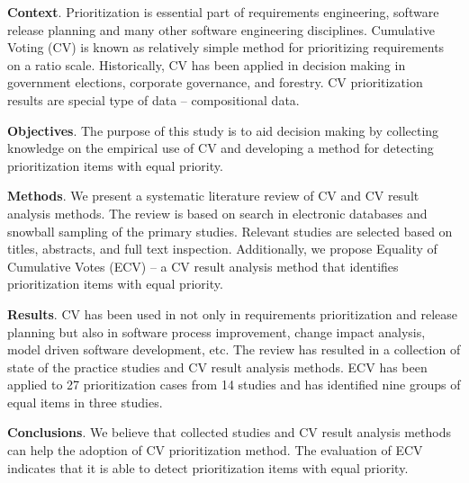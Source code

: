 
\textbf{Context}.
Prioritization is essential part of requirements engineering, software release planning and many other software engineering disciplines.
Cumulative Voting (CV) is known as relatively simple method for prioritizing requirements on a ratio scale.
Historically, CV has been applied in decision making in government elections, corporate governance, and forestry.
CV prioritization results are special type of data -- compositional data.

\textbf{Objectives}.
The purpose of this study is to aid decision making by collecting knowledge on the empirical use of CV and
developing a method for detecting prioritization items with equal priority.

\textbf{Methods}.
We present a systematic literature review of CV and CV result analysis methods.
The review is based on search in electronic databases and snowball sampling of the primary studies.
Relevant studies are selected based on titles, abstracts, and full text inspection.
Additionally, we propose Equality of Cumulative Votes (ECV) -- a CV result analysis method that identifies prioritization items with equal priority.

\textbf{Results}.
CV has been used in not only in requirements prioritization and release planning but also in software process improvement, change impact analysis, model driven software development, etc.
The review has resulted in a collection of state of the practice studies and CV result analysis methods.
ECV has been applied to 27 prioritization cases from 14 studies and has identified nine groups of equal items in three studies.

\textbf{Conclusions}.
We believe that collected studies and CV result analysis methods can help the adoption of CV prioritization method.
The evaluation of ECV indicates that it is able to detect prioritization items with equal priority.